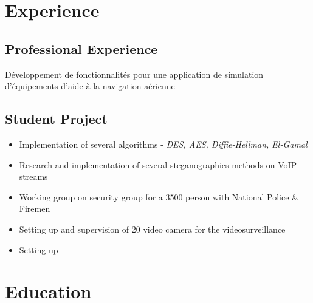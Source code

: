 \documentclass[11pt,a4paper,francais]{moderncv}
\begin{document}
\maketitle
\vspace*{-3\baselineskip}

\section{Experience}
\subsection{Professional Experience}
{Développement de fonctionnalités pour une application de simulation d'équipements d'aide à la navigation 
aérienne}

\subsection{Student Project}
{
\begin{itemize}
 \item Implementation of several algorithms - \textit{DES, AES, Diffie-Hellman, El-Gamal}
 \item Research and implementation of several steganographics methods on VoIP streams
\end{itemize}
}
{
\begin{itemize}
  \item Working group on security group for a 3500 person with National Police \& Firemen 
  \item Setting up and supervision of 20 video camera for the videosurveillance
  \item Setting up 
\end{itemize}
}


\section{Education}
\end{document}
